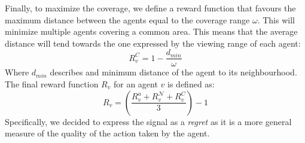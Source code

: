Finally, to maximize the coverage, 
  we define a reward function that favours the maximum distance between the agents
  equal to the coverage range $\omega$. This will minimize multiple agents covering a common area.
%
This means that the average distance will tend towards the one expressed by the viewing range of each agent:
% 
\begin{equation*}
R^{C}_{v} = 1 - \frac{d_{min}}{\omega}
\end{equation*}
Where $d_{min}$ describes and minimum distance of the agent to its neighbourhood. 
%
The final reward function $R_{v}$ for an agent $v$ is defined as:
\begin{equation*}
 R_{v} = (\frac{R^a_{v} + R^{\mathcal{N}}_{v} + R^{C}_{v}}{3}) - 1  
\end{equation*}
Specifically, we decided to express the signal as a \emph{regret}
  as it is a more general measure of the quality of the action taken by the agent.
%
